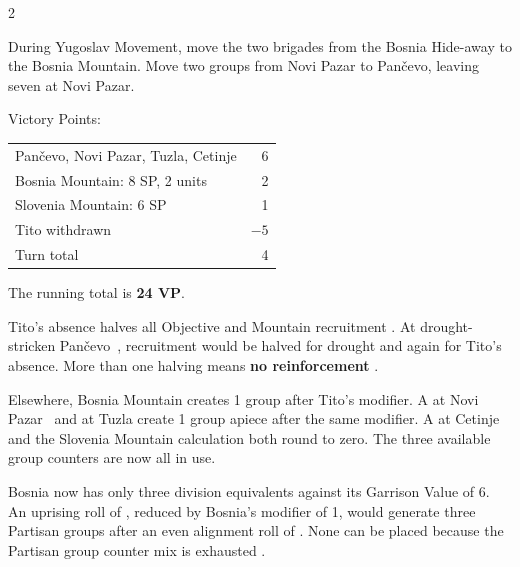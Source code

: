 \begin{multicols}{2}

During Yugoslav Movement, move the two brigades from the Bosnia Hide-away to
the Bosnia Mountain. Move two groups from Novi Pazar to Pančevo, leaving seven
at Novi Pazar.

Victory Points:

\begin{tabularx}{\linewidth}{@{}Xr@{}}
  Pančevo, Novi Pazar, Tuzla, Cetinje & 6 \\
  Bosnia Mountain: 8 SP, 2 units & 2 \\
  Slovenia Mountain: 6 SP & 1 \\
  Tito withdrawn & $-5$ \\
  \midrule
  Turn total & 4 \\
\end{tabularx}

The running total is \textbf{24 VP}.


Tito's absence halves all Objective and Mountain recruitment
. At drought-stricken Pančevo~, recruitment would
be halved for drought and again for Tito's absence. More than one halving means
\textbf{no reinforcement} .

Elsewhere, Bosnia Mountain creates 1 group after Tito's modifier. A
 at Novi Pazar~ and  at Tuzla create 1 group apiece
after the same modifier. A  at Cetinje and the Slovenia Mountain
calculation both round to zero. The three available group counters are now all
in use.

Bosnia now has only three division equivalents against its Garrison Value of
6. An uprising roll of , reduced by Bosnia's modifier of 1, would
generate three Partisan groups after an even alignment roll of .
None can be placed because the Partisan group counter mix is exhausted
.
\end{multicols}

